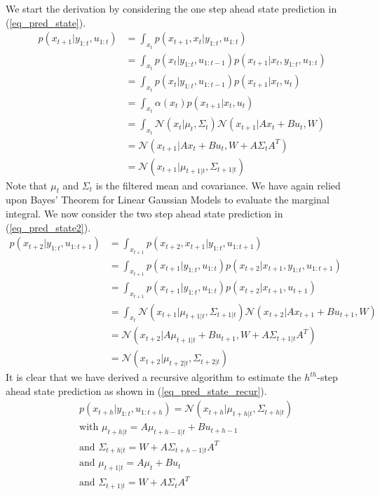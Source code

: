 \documentclass[../masters.tex]{subfiles}
\begin{document}
We start the derivation by considering the one step ahead state prediction in (\ref{eq_pred_state}).
\begin{equation}
\begin{aligned}
p(x_{t+1}|y_{1:t}, u_{1:t}) &= \int_{x_t} p(x_{t+1},x_t|y_{1:t}, u_{1:t}) \\
&= \int_{x_t} p(x_t|y_{1:t}, u_{1:t-1}) p(x_{t+1}|x_t,y_{1:t}, u_{1:t}) \\
&= \int_{x_t} p(x_t|y_{1:t}, u_{1:t-1}) p(x_{t+1}|x_t, u_{t}) \\
&= \int_{x_t} \alpha(x_t) p(x_{t+1}|x_t, u_{t}) \\
&= \int_{x_t} \mathcal{N}(x_t|\mu_t, \Sigma_t) \mathcal{N}(x_{t+1}|Ax_t+Bu_t, W) \\
&= \mathcal{N}(x_{t+1}|Ax_t+Bu_t, W+A\Sigma_t A^T) \\
&= \mathcal{N}(x_{t+1}|\mu_{t+1|t}, \Sigma_{t+1|t})
\end{aligned}
\label{eq_pred_state}
\end{equation}
Note that $\mu_t$ and $\Sigma_t$ is the filtered mean and covariance. We have again relied upon Bayes' Theorem for Linear Gaussian Models to evaluate the marginal integral. We now consider the two step ahead state prediction in (\ref{eq_pred_state2}).
\begin{equation}
\begin{aligned}
p(x_{t+2}|y_{1:t}, u_{1:t+1}) &= \int_{x_{t+1}} p(x_{t+2},x_{t+1}|y_{1:t}, u_{1:t+1}) \\
&= \int_{x_{t+1}} p(x_{t+1}|y_{1:t}, u_{1:t}) p(x_{t+2}|x_{t+1},y_{1:t}, u_{1:t+1}) \\
&= \int_{x_{t+1}} p(x_{t+1}|y_{1:t}, u_{1:t}) p(x_{t+2}|x_{t+1}, u_{t+1}) \\
&= \int_{x_t} \mathcal{N}(x_{t+1}|\mu_{t+1|t}, \Sigma_{t+1|t})\mathcal{N}(x_{t+2}|Ax_{t+1}+Bu_{t+1}, W) \\
&= \mathcal{N}(x_{t+2}|A\mu_{t+1|t}+Bu_{t+1}, W+A\Sigma_{t+1|t} A^T) \\
&= \mathcal{N}(x_{t+2}|\mu_{t+2|t}, \Sigma_{t+2|t})
\end{aligned}
\label{eq_pred_state2}
\end{equation}
It is clear that we have derived a recursive algorithm to estimate the $h^{th}$-step ahead state prediction as shown in (\ref{eq_pred_state_recur}).
\begin{equation}
\begin{aligned}
&p(x_{t+h}|y_{1:t}, u_{1:t+h}) = \mathcal{N}(x_{t+h}|\mu_{t+h|t}, \Sigma_{t+h|t}) \\
&\text{with } \mu_{t+h|t} = A\mu_{t+h-1|t}+Bu_{t+h-1} \\
&\text{and } \Sigma_{t+h|t} = W+A\Sigma_{t+h-1|t} A^T \\
&\text{and } \mu_{t+1|t} = A\mu_t+Bu_{t} \\
&\text{and } \Sigma_{t+1|t} = W+A\Sigma_t A^T \\ 
\end{aligned}
\label{eq_pred_state_recur}
\end{equation}
\end{document}
